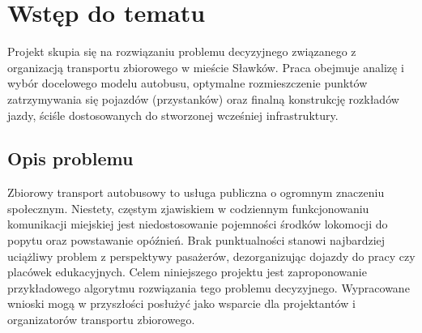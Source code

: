 \chapter{Wstęp do tematu}
Projekt skupia się na rozwiązaniu problemu decyzyjnego związanego z organizacją transportu zbiorowego w mieście Sławków. Praca obejmuje analizę i wybór docelowego modelu autobusu, optymalne rozmieszczenie punktów zatrzymywania się pojazdów (przystanków) oraz finalną konstrukcję rozkładów jazdy, ściśle dostosowanych do stworzonej wcześniej infrastruktury.
\section{Opis problemu}
Zbiorowy transport autobusowy to usługa publiczna o ogromnym znaczeniu społecznym. Niestety, częstym zjawiskiem w codziennym funkcjonowaniu komunikacji miejskiej jest niedostosowanie pojemności środków lokomocji do popytu oraz powstawanie opóźnień. Brak punktualności stanowi najbardziej uciążliwy problem z perspektywy pasażerów, dezorganizując dojazdy do pracy czy placówek edukacyjnych. Celem niniejszego projektu jest zaproponowanie przykładowego algorytmu rozwiązania tego problemu decyzyjnego. Wypracowane wnioski mogą w przyszłości posłużyć jako wsparcie dla projektantów i organizatorów transportu zbiorowego.